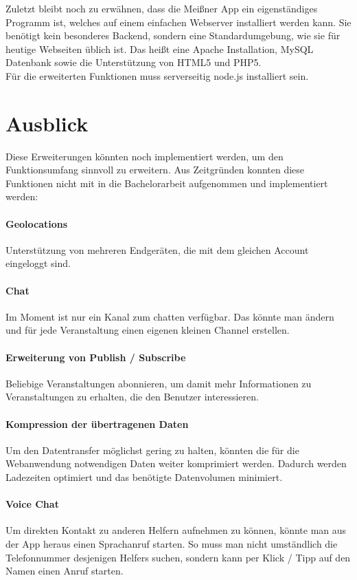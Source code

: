 Zuletzt bleibt noch zu erwähnen, dass die Meißner App ein eigenständiges Programm ist, welches auf einem einfachen Webserver installiert werden kann. Sie benötigt kein besonderes Backend, sondern eine Standardumgebung, wie sie für heutige Webseiten üblich ist. Das heißt eine Apache Installation, MySQL Datenbank sowie die Unterstützung von HTML5 und PHP5.\\
Für die erweiterten Funktionen muss serverseitig node.js installiert sein.



\section{Ausblick}
Diese Erweiterungen könnten noch implementiert werden, um den Funktionsumfang sinnvoll zu erweitern. Aus Zeitgründen konnten diese Funktionen nicht mit in die Bachelorarbeit aufgenommen und implementiert werden:

\paragraph{Geolocations}
Unterstützung von mehreren Endgeräten, die mit dem gleichen Account eingeloggt sind.

\paragraph{Chat}
Im Moment ist nur ein Kanal zum chatten verfügbar. Das könnte man ändern und für jede Veranstaltung einen eigenen kleinen Channel erstellen.

\paragraph{Erweiterung von Publish / Subscribe}
Beliebige Veranstaltungen abonnieren, um damit mehr Informationen zu Veranstaltungen zu erhalten, die den Benutzer interessieren.

\paragraph{Kompression der übertragenen Daten}
Um den Datentransfer möglichst gering zu halten, könnten die für die Webanwendung notwendigen Daten weiter komprimiert werden. Dadurch werden Ladezeiten optimiert und das benötigte Datenvolumen minimiert.

\paragraph{Voice Chat}
Um direkten Kontakt zu anderen Helfern aufnehmen zu können, könnte man aus der App heraus einen Sprachanruf starten. So muss man nicht umständlich die Telefonnummer desjenigen Helfers suchen, sondern kann per Klick / Tipp auf den Namen einen Anruf starten.



